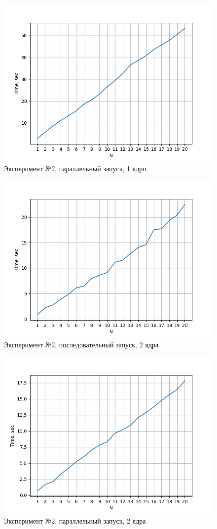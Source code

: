 \documentclass{article}
\begin{document}
\begin{figure}
    \centering
    \includegraphics[scale=0.7]{Graphic-6.png}
    \caption{Эксперимент №2, параллельный запуск, 1 ядро}
    \label{fig:enter-label}
\end{figure}

\begin{figure}
    \centering
    \includegraphics[scale=0.7]{Graphic-7.png}
    \caption{Эксперимент №2, последовательный запуск, 2 ядра}
    \label{fig:enter-label}
\end{figure}

\begin{figure}
    \centering
    \includegraphics[scale=0.7]{Graphic-8.png}
    \caption{Эксперимент №2, параллельный запуск, 2 ядра}
    \label{fig:enter-label}
\end{figure}
\end{document}

